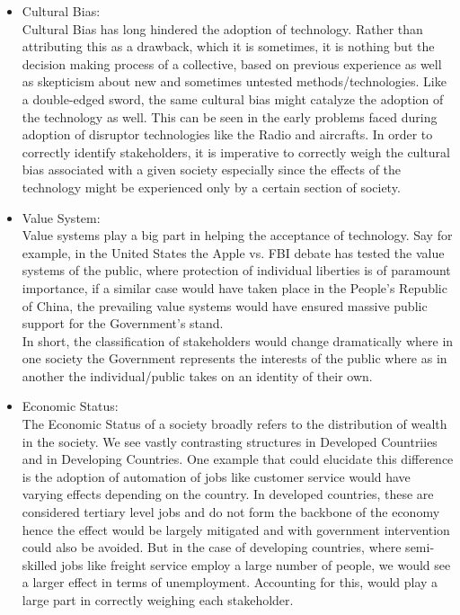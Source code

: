 \begin{itemize}
\item Cultural Bias:\\
Cultural Bias has long hindered the adoption of technology. Rather than attributing this as a drawback, which it is sometimes, it is nothing but the decision making process of a collective, based on previous experience as well as skepticism about new and sometimes untested methods/technologies. Like a double-edged sword, the same cultural bias might catalyze the adoption of the technology as well. This can be seen in the early problems faced during adoption of disruptor technologies like the Radio and aircrafts. In order to correctly identify stakeholders, it is imperative to correctly weigh the cultural bias associated with a given society especially since the effects of the technology might be experienced only by a certain section of society.
\item  Value System:\\
Value systems play a big part in helping the acceptance of technology. Say for example, in the United States the Apple vs. FBI debate has tested the value systems of the public, where protection of individual liberties is of paramount importance, if a similar case would have taken place in the People's Republic of China, the prevailing value systems would have ensured massive public support for the Government's stand.\\
In short, the classification of stakeholders would change dramatically where in one society the Government represents the interests of the public where as in another the individual/public takes on an identity of their own.
\item Economic Status:\\
The Economic Status of a society broadly refers to the distribution of wealth in the society. We see vastly contrasting structures in Developed Countriies and in Developing Countries. One example that could elucidate this difference is the adoption of automation of jobs like customer service would have varying effects depending on the country. In developed countries, these are considered tertiary level jobs and do not form the backbone of the economy hence the effect would be largely mitigated and with government intervention could also be avoided. But in the case of developing countries, where semi-skilled jobs like freight service employ a large number of people, we would see a larger effect in terms of unemployment. Accounting for this, would play a large part in correctly weighing each stakeholder.
\end{itemize}


